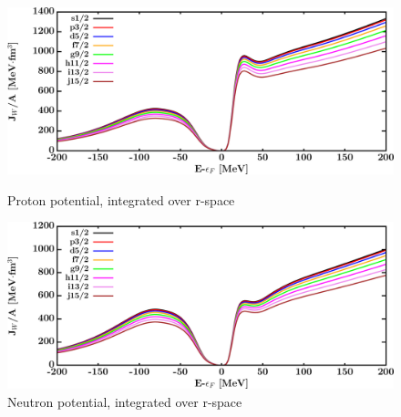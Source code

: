 \begin{figure}[H]
    \centering
    \begin{minipage}{0.45\textwidth}
        \centering
        \includegraphics[width=1.0\textwidth]{figures/pb208_protonVolumeIntegrals.png}
        \caption{Proton potential, integrated over r-space}
        \label{DOMFitData_pb208_proton_potentialIntegral}
    \end{minipage}\hfill
    \begin{minipage}{0.45\textwidth}
        \centering
        \includegraphics[width=1.0\textwidth]{figures/pb208_neutronVolumeIntegrals.png}
        \caption{Neutron potential, integrated over r-space}
        \label{DOMFitData_pb208_neutron_potentialIntegral}
    \end{minipage}
\end{figure}

\afterpage{\clearpage}

